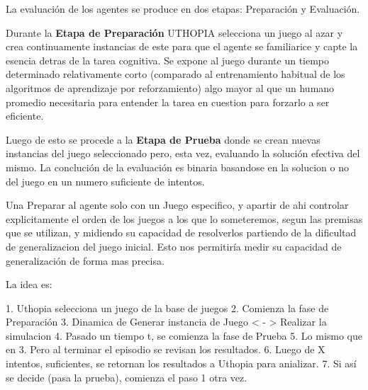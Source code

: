 La evaluación de los agentes se produce en dos etapas: Preparación y Evaluación.

Durante la \textbf{Etapa de Preparación} UTHOPIA selecciona un juego al azar y crea continuamente instancias de este para que el agente se familiarice y capte la esencia detras de la tarea cognitiva. Se expone al juego durante un tiempo determinado relativamente corto (comparado al entrenamiento habitual de los algoritmos de aprendizaje por reforzamiento) algo mayor al que un humano promedio necesitaria para entender la tarea en cuestion para forzarlo a ser eficiente. 

Luego de esto se procede a la \textbf{Etapa de Prueba} donde se crean nuevas instancias del juego seleccionado pero, esta vez, evaluando la solución efectiva del mismo. La conclución de la evaluación es binaria basandose en la solucion o no del juego en un numero suficiente de intentos.

Una Preparar al agente solo con un Juego especifico, y apartir de ahi controlar explicitamente el orden de los juegos a los que lo someteremos, segun las premisas que se utilizan, y midiendo su capacidad de resolverlos partiendo de la dificultad de generalizacion del juego inicial. Esto nos permitiría medir su capacidad de generalización de forma mas precisa.

La idea es:

1. Uthopia selecciona un juego de la base de juegos
2. Comienza la fase de Preparación
3. Dinamica de Generar instancia  de Juego < - > Realizar la simulacion
4. Pasado un tiempo t, se comienza la fase de Prueba
5. Lo mismo que en 3. Pero al terminar el episodio se revisan los resultados.
6. Luego de X intentos, suficientes, se retornan los resultados a Uthopia para anializar. 
7. Si así se decide (pasa la prueba), comienza el paso 1 otra vez.